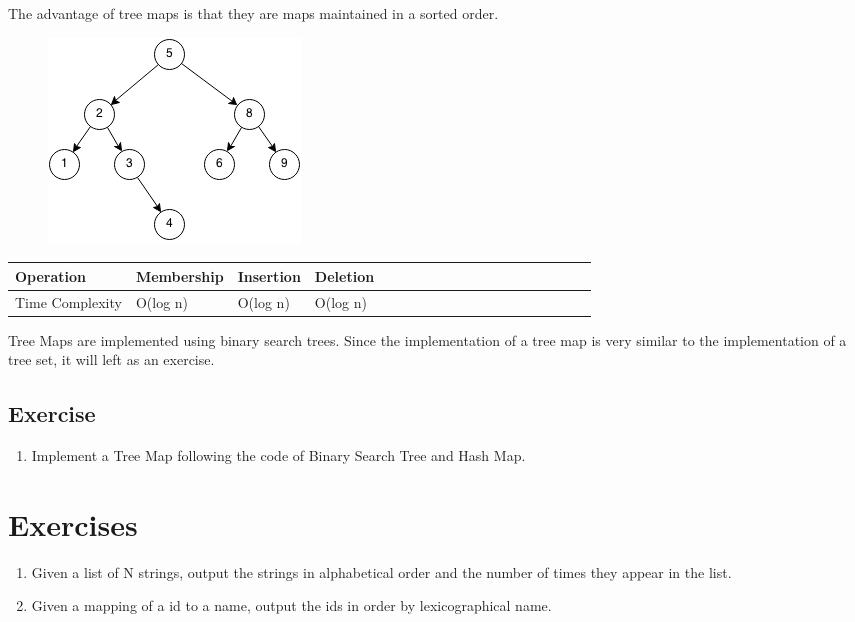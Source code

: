 \documentclass[11pt,oneside]{book}
\makeatletter
\def\maxwidth#1{\ifdim\Gin@nat@width>#1 #1\else\Gin@nat@width\fi}
\makeatother
\begin{document}
The advantage of tree maps is that they are maps maintained in a sorted order.

\vspace{5px}\begin{figure}[H]\centering
        \includegraphics[width=0.66\maxwidth{\textwidth}]{bst.png}
        \end{figure}

\begin{center}\begin{tabulary}{0.4\linewidth}{|l|l|l|l|l|l|l|l|l|l|l|l|l|l|l|l|l|l|l}\hline


  Operation &
  Membership &
  Insertion &
  Deletion\\
\hline


  Time Complexity &
  O(log n) &
  O(log n) &
  O(log n)\\

\hline\end{tabulary}\end{center}

Tree Maps are implemented using binary search trees. Since the implementation of a tree map is very similar to the implementation of a tree set, it will left as an exercise.

\subsection{Exercise}

\begin{enumerate}
\item Implement a Tree Map following the code of Binary Search Tree and Hash Map.
\end{enumerate}

        \section{ Exercises }
        

\begin{enumerate}
\item Given a list of N strings, output the strings in alphabetical order and the number of times they appear in the list.
\item Given a mapping of a id to a name, output the ids in order by lexicographical name.
\end{enumerate}
\end{document}
